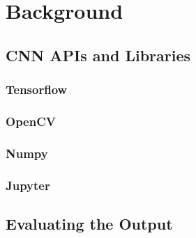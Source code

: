 \chapter{Background}
\label{background}













\section{CNN APIs and Libraries}
\subsection*{Tensorflow}


\subsection*{OpenCV}


\subsection*{Numpy}


\subsection*{Jupyter}


\section{Evaluating the Output}


